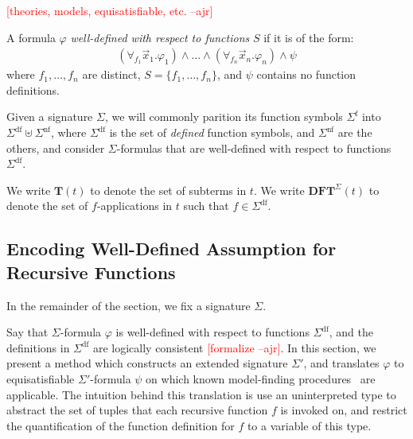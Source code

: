 \documentclass[runningheads,a4paper]{llncs}
\newcommand{\terms}{\mathbf{T}}
\newcommand{\functerms}{\mathbf{DFT}}
\newcommand{\sfuns}[1]{#1^\mathrm{f}}
\newcommand{\sfundefs}[1]{#1^\mathrm{df}}
\newcommand{\sfunndefs}[1]{#1^\mathrm{nf}}
\newcommand{\forallf}[1]{\forall_{#1}}
\newcommand{\rem}[1]{\textcolor{red}{[#1]}}
\newcommand{\ajr}[1]{\rem{#1 --ajr}}
\begin{document}
\ajr{theories, models, equisatisfiable, etc.}


\begin{definition}
A formula $\varphi$ \emph{well-defined with respect to functions} $S$ if it is of the form:
\begin{eqnarray} \label{eq:wdf}
(\forallf{f_1} \vec x_1. \varphi_1) \wedge \ldots \wedge (\forallf{f_n} \vec x_n. \varphi_n) \wedge \psi
\end{eqnarray}
where $f_1, \ldots, f_n$ are distinct, 
$S = \{ f_1, \ldots, f_n \}$,
and $\psi$ contains no function definitions.
\end{definition}

Given a signature $\Sigma$, 
we will commonly parition its function symbols $\sfuns{\Sigma}$ into $\sfundefs{\Sigma} \mathrel{\uplus} \sfunndefs{\Sigma}$,
where $\sfundefs{\Sigma}$ is the set of \emph{defined} function symbols,
and $\sfunndefs{\Sigma}$ are the others,
and consider $\Sigma$-formulas that are well-defined with respect to functions $\sfundefs{\Sigma}$.

We write $\terms( t )$ to denote the set of subterms in $t$.
We write $\functerms^\Sigma( t )$ to denote the set of $f$-applications in $t$ such that $f \in \sfundefs{\Sigma}$.

\subsection{Encoding Well-Defined Assumption for Recursive Functions}
\label{sec:encoding}

In the remainder of the section, we fix a signature $\Sigma$.


Say that $\Sigma$-formula $\varphi$ is well-defined with respect to functions $\sfundefs{\Sigma}$,
and the definitions in $\sfundefs{\Sigma}$ are logically consistent \ajr{formalize}.
In this section, we present a method which constructs an extended signature $\Sigma'$,
and translates $\varphi$ to equisatisfiable $\Sigma'$-formula $\psi$ on which known model-finding procedures~\cite{GeDeM-CAV-09, ReyEtAl-1-RR-13} are applicable.
The intuition behind this translation is use an uninterpreted type to abstract the set of tuples that each recursive function $f$ is invoked on,
and restrict the quantification of the function definition for $f$ to a variable of this type.
\end{document}
